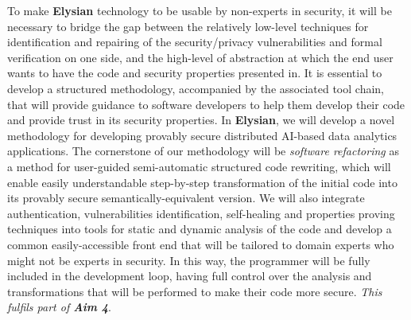 \documentclass[a4paper,11pt]{article}
\newcommand{\project}[1]{\textbf{#1}\xspace}
\newcommand{\SECURITY}{\project{Elysian}}
\newcommand{\TheProject}{\SECURITY}
\begin{document}
To make \TheProject{} technology to be usable by non-experts in security, it will be necessary to bridge the gap between the relatively low-level techniques for identification and repairing of the security/privacy vulnerabilities and formal verification on one side, and the high-level of abstraction at which the end user wants to have the code and security properties presented in. It is essential to develop a structured methodology, accompanied by the associated tool chain, that will provide guidance to software developers to help them develop their code and provide trust in its security properties. In \TheProject{}, we will develop a novel methodology for developing provably secure distributed AI-based data analytics applications. The cornerstone of our methodology will be \emph{software refactoring} as a method for user-guided semi-automatic structured code rewriting, %
which will enable easily understandable step-by-step transformation of the initial code into its provably secure semantically-equivalent version. We will also integrate authentication, vulnerabilities identification, self-healing and properties proving techniques into tools for static and dynamic analysis of the code and develop a common easily-accessible front end that will be tailored to domain experts who might not be experts in security. In this way, the programmer will be fully included in the development loop, having full control over the analysis and transformations that will be performed to make their code more secure. %
\emph{This fulfils part of \textbf{Aim 4}}.
\end{document}
